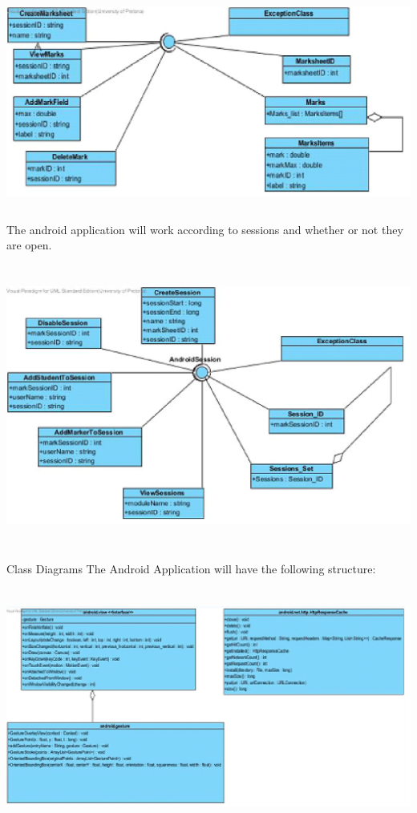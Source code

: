 \documentclass{article}
\begin{document}
\textbf{\includegraphics*[width=5.83in, height=2.74in, keepaspectratio=false]{image18}}

\noindent  The android application will work according to sessions and whether or not they are open.

\noindent 

\noindent 

\textbf{\includegraphics*[width=6.22in, height=3.66in, keepaspectratio=false]{image19}}



\noindent 

\noindent Class Diagrams The Android Application will have the following structure:

\textbf{\includegraphics*[width=6.20in, height=3.08in, keepaspectratio=false]{image20}}
\end{document}

